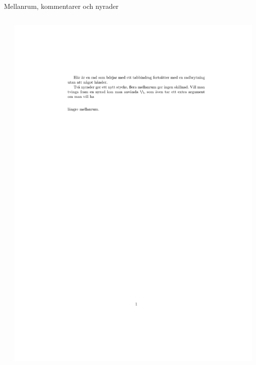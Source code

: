 \documentclass[xcolor=x11names,compress,swedish]{beamer}
\begin{document}
		\begin{frame}[fragile]{Mellanrum, kommentarer och nyrader}
			\begin{columns}
				\begin{column}{0.5\textwidth}
						
				\end{column}
				\begin{column}{0.5\textwidth}
					\includegraphics[trim=5cm 8cm 5cm 2cm, width=\linewidth]{examples/example2.pdf}
				\end{column}
			\end{columns}
		\end{frame}
		
\end{document}
